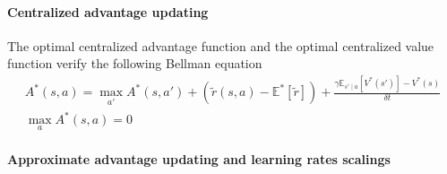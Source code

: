 \documentclass[11pt]{article}
\newcommand{\deltat}{{\delta t}}
\newcommand{\E}{\mathbb{E}}
\begin{document}
\paragraph{Centralized advantage updating}
The optimal centralized advantage function and the optimal centralized value
function verify the following Bellman equation
\begin{gather}
	A^*(s, a) = \max\limits_{a'} A^*(s, a') + 
		(\tilde{r}(s, a) - \E^*\left[
			\tilde{r}
		\right]
		) + 
		\frac{\gamma \E_{s'\mid a}\left[
			V^*(s')
		\right] - V^*(s)
		}{
		\deltat
	}\\
	\max\limits_{a} A^*(s, a) = 0
\end{gather}

\paragraph{Approximate advantage updating and learning rates scalings}
\end{document}
